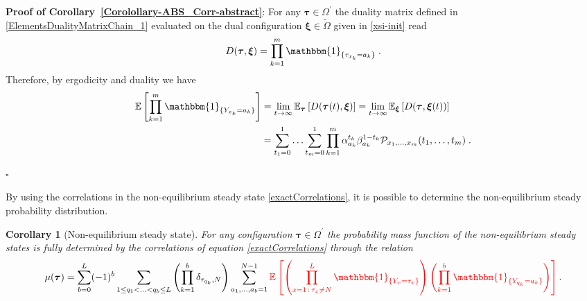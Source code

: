 \documentclass[10pt]{article}
\numberwithin{equation}{section}
\numberwithin{equation}{subsection}
\newtheorem{corollary}{Corollary}
\newcommand{\dt}{\;.}
\begin{document}
\textbf{Proof of Corollary~\ref{Corolollary-ABS_Corr-abstract}}:
For any $\bm{\tau}\in \Omega^{'}$ the duality matrix defined in \eqref{ElementsDualityMatrixChain_1} evaluated on the dual configuration $\bm{\xi}\in\widetilde{\Omega}$ given in \eqref{xsi-init} read
\begin{equation}
	D(\bm{\tau},\bm{\xi})%
	=\prod_{k=1}^{m}\mathbbm{1}_{\{\tau_{x_{k}}=a_{k}\}}\dt
\end{equation}
Therefore, by ergodicity and duality  we have 
\begin{equation}\label{CorrelationByABS-prob}
	\begin{split}
\mathbb{E}\left[\prod_{k=1}^{m}\mathbbm{1}_{\{Y_{x_{k}}=a_{k}\}}\right]&=\lim_{t\to \infty}\mathbb{E}_{\bm{\tau}}\left[D(\bm{\tau}(t),\bm{{\xi}})\right]=\lim_{t\to \infty}\mathbb{E}_{\bm{\xi}}\left[D(\bm{\tau},\bm{{\xi}}(t))\right]
	\\&=\sum_{t_{1}=0}^{1}\ldots \sum_{t_{m}=0}^{1}\prod_{k=1}^{m}\alpha_{a_{k}}^{t_{k}}\beta_{a_{k}}^{1-t_{k}}\mathcal{P}_{x_{1},\ldots,x_{m}}(t_{1},\ldots,t_{m})\dt
\end{split}
\end{equation} 
\begin{flushright}
	$\square$
\end{flushright} 
{\color{blue}By using the correlations in the non-equilibrium steady state \eqref{exactCorrelations}, it is possible to determine the non-equilibrium steady probability distribution. }
    \begin{corollary}[Non-equilibrium steady state]\label{Corollary-NESS-ABS}
For any configuration $\bm{\tau}\in \Omega^{'}$  the probability mass function of the non-equilibrium steady states is fully determined by the correlations of equation \eqref{exactCorrelations} through the relation 
\begin{equation}\label{implicit-mass-function}
	\mu(\bm{\tau})=\sum_{b=0}^{L}(-1)^{b}\sum_{1\leq q_{1}<\ldots<q_{b}\leq L}\left(\prod_{k=1}^{b}\delta_{\tau_{q_{k}},N}\right)\sum_{a_{{1}},\ldots,a_{{b}}=1}^{N-1}{\color{red}
	\mathbb{E}\left[\left( \prod_{x=1\,:\,\tau_{x}\neq N}^{L}\mathbbm{1}_{\{Y_{x}=\tau_{x}\}}\right) \left(\prod_{k=1}^{b}\mathbbm{1}_{\{Y_{q_{k}}=a_{{k}}\}}\right)\right]}\,.
\end{equation}
\end{corollary}
\end{document}
